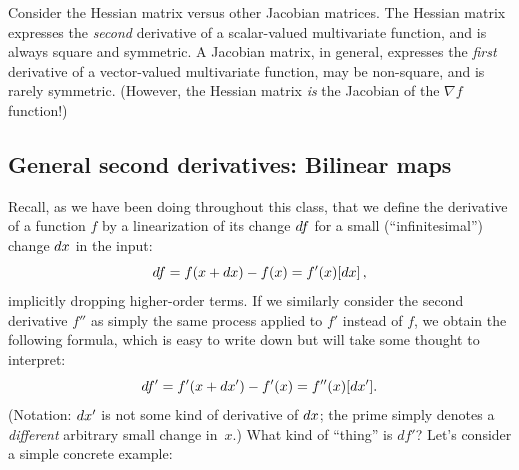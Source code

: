 \begin{remark}
Consider the Hessian matrix versus other Jacobian matrices.  The Hessian matrix expresses the \emph{second} derivative of a scalar-valued multivariate function, and is always square and symmetric.  A Jacobian matrix, in general, expresses the \emph{first} derivative of a vector-valued multivariate function, may be non-square, and is rarely symmetric.  (However, the Hessian matrix \emph{is} the Jacobian of the $\nabla f$ function!)
\end{remark}

\subsection{General second derivatives: Bilinear maps}

Recall, as we have been doing throughout this class, that we define the derivative of a function $f$ by a linearization of its change $d f$ for a small (``infinitesimal'') change $d x$ in the input: 
\[
d f = f(x + d x) - f(x) = f'(x) [d x] \, ,
\]
implicitly dropping higher-order terms.
If we similarly consider the second derivative $f''$ as simply the same process applied to $f'$ instead of $f$, we  obtain the following formula, which is easy to write down but will take some thought to interpret: 
\[
d f' = f'(x + d x') - f'(x) = f''(x) [d x'].
\]
(Notation: $d x'$ is not some kind of derivative of $d x$; the prime simply denotes a \emph{different}
arbitrary small change in~$x$.) What kind of ``thing'' is $df'$?   Let's consider a simple concrete example:

